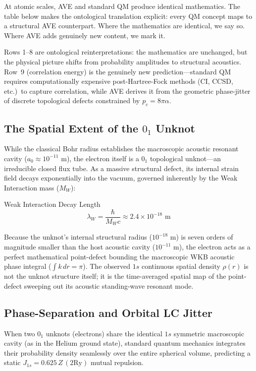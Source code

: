 At atomic scales, AVE and standard QM produce identical mathematics.  The table below makes the ontological translation explicit: every QM concept maps to a structural AVE counterpart.  Where the mathematics are identical, we say so.  Where AVE adds genuinely new content, we mark it.



\noindent
Rows 1--8 are ontological reinterpretations: the mathematics are unchanged, but the physical picture shifts from probability amplitudes to structural acoustics.  Row~9 (correlation energy) is the genuinely new prediction---standard QM requires computationally expensive post-Hartree-Fock methods (CI, CCSD, etc.)\ to capture correlation, while AVE derives it from the geometric phase-jitter of discrete topological defects constrained by $p_c = 8\pi\alpha$.

\subsection{The Spatial Extent of the $0_1$ Unknot}
While the classical Bohr radius establishes the macroscopic acoustic resonant cavity ($a_0 \approx 10^{-11}\text{ m}$), the electron itself is a $0_1$ topological unknot---an irreducible closed flux tube. As a massive structural defect, its internal strain field decays exponentially into the vacuum, governed inherently by the Weak Interaction mass ($M_W$):
\begin{resultbox}{Weak Interaction Decay Length}
\begin{equation}
    \lambda_W = \frac{\hbar}{M_W c} \approx 2.4 \times 10^{-18}\text{ m}
\end{equation}
\end{resultbox}
Because the unknot's internal structural radius ($10^{-18}\text{ m}$) is seven orders of magnitude smaller than the host acoustic cavity ($10^{-11}\text{ m}$), the electron acts as a perfect mathematical point-defect bounding the macroscopic WKB acoustic phase integral ($\int k\,dr = \pi$). The observed $1s$ continuous spatial density $\rho(r)$ is not the unknot structure itself; it is the time-averaged spatial map of the point-defect sweeping out its acoustic standing-wave resonant mode.

\subsection{Phase-Separation and Orbital LC Jitter}
When two $0_1$ unknots (electrons) share the identical $1s$ symmetric macroscopic cavity (as in the Helium ground state), standard quantum mechanics integrates their probability density seamlessly over the entire spherical volume, predicting a static $J_{1s} = 0.625\, Z\, (2\text{Ry})$ mutual repulsion. 


